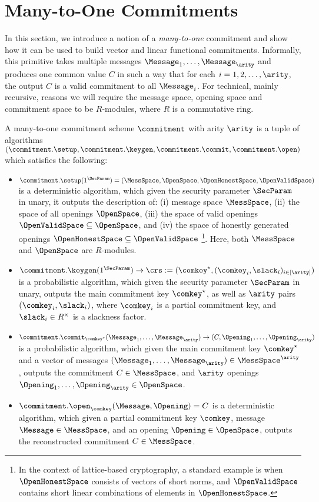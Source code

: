 	
	\section{Many-to-One Commitments}\label{sec:many-to-one-com}
	In this section, we introduce a notion of a \textit{many-to-one} commitment and show how it can be used to build vector and linear functional commitments. Informally, this primitive takes multiple messages $\Message_1,\ldots,\Message_\arity$ and  produces one common value $C$ in such a way that for each $i=1,2,\ldots,\arity$, the output $C$ is a valid commitment to all  $\Message_i$. For technical, mainly recursive, reasons we will require the message space, opening space and commitment space to be $R$-modules, where $R$ is a commutative ring.
	\begin{definition}
		A many-to-one commitment scheme $\commitment$ with arity $\arity$ is a tuple of algorithms $(\commitment.\setup, \commitment.\keygen, \commitment.\commit,\commitment.\open)$ which satisfies the following:
		\begin{itemize}
                \item $\commitment.\setup(1^\SecParam) = (\MessSpace,\OpenSpace,\OpenHonestSpace,\OpenValidSpace)$ is a deterministic algorithm, which given  the security parameter $\SecParam$ in unary, it outputs the description of: (i) message space $\MessSpace$, (ii) the space of all openings $\OpenSpace$, (iii) the space of valid openings $\OpenValidSpace \subseteq \OpenSpace$, and (iv) the space of honestly generated openings $\OpenHonestSpace \subseteq \OpenValidSpace $ \footnote{In the context of lattice-based cryptography, a standard example is when $\OpenHonestSpace$ consists of vectors of short norms, and $\OpenValidSpace$ contains short linear combinations of elements in $\OpenHonestSpace$.}. Here, both $\MessSpace$ and $\OpenSpace$ are $R$-modules.	
    		\item $\commitment.\keygen(1^\SecParam) \rightarrow \crs:=(\comkey^\star,(\comkey_i,\slack_i)_{i\in [\arity]})$ is a probabilistic algorithm, which given the security parameter $\SecParam$ in unary, outputs the main commitment key $\comkey^\star$, as well as $\arity$ pairs $(\comkey_i,\slack_i)$, where $\comkey_i$ is a partial commitment key, and $\slack_i \in R^\times$ is a slackness factor. 
                \item $\commitment.\commit_{\comkey^\star}(\Message_1,\ldots,\Message_\arity) \rightarrow (C, \Opening_1,\ldots,\Opening_\arity)$ is a probabilistic algorithm, which given the main commitment key $\comkey^\star$ and a vector of messages $(\Message_1,\ldots,\Message_\arity) \in \MessSpace^\arity$, outputs the commitment $C \in \MessSpace$, and $\arity$ openings $\Opening_1,\ldots,\Opening_\arity \in \OpenSpace$.
			\item $\commitment.\open_{\comkey}(\Message, \Opening) = C$ is a deterministic algorithm, which given a partial commitment key $\comkey$, message $\Message \in \MessSpace$, and an opening $\Opening \in \OpenSpace$, outputs the reconstructed commitment $C \in \MessSpace$.
		\end{itemize}
	\end{definition}
